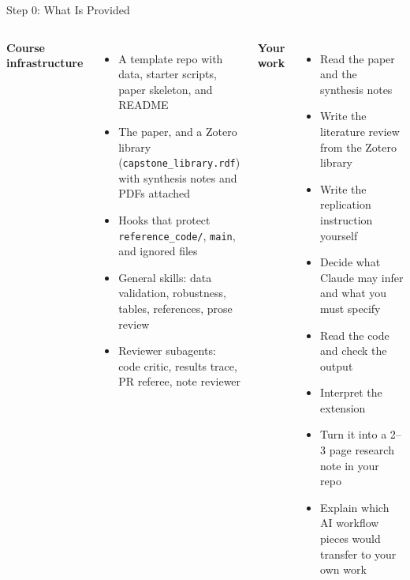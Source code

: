 \documentclass[aspectratio=169, 11pt]{beamer}
\begin{document}
\begin{frame}{Step 0: What Is Provided}
  \begin{columns}[T]
    \textbf{Course infrastructure}
    \begin{itemize}\small
      \item A template repo with data, starter scripts, paper skeleton, and README
      \item The paper, and a Zotero library (\texttt{capstone\_library.rdf}) with synthesis notes and PDFs attached
      \item Hooks that protect \texttt{reference\_code/}, \texttt{main}, and ignored files
      \item General skills: data validation, robustness, tables, references, prose review
      \item Reviewer subagents: code critic, results trace, PR referee, note reviewer
    \end{itemize}

    \textbf{Your work}
    \begin{itemize}\small
      \item Read the paper and the synthesis notes
      \item Write the literature review from the Zotero library
      \item Write the replication instruction yourself
      \item Decide what Claude may infer and what you must specify
      \item Read the code and check the output
      \item Interpret the extension
      \item Turn it into a 2--3 page research note in your repo
      \item Explain which AI workflow pieces would transfer to your own work
    \end{itemize}
  \end{columns}

  \vspace{0.7em}
\end{frame}
\end{document}
